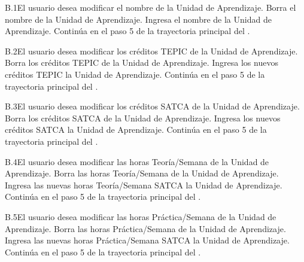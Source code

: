 
\begin{UCtrayectoriaA}{B.1}{El usuario desea modificar el nombre de la Unidad de Aprendizaje.}
	\UCpaso[\UCactor] Borra el nombre de la Unidad de Aprendizaje.
	\UCpaso[\UCactor] Ingresa el nombre de la Unidad de Aprendizaje.
	\UCpaso Continúa en el paso 5 de la trayectoria principal del .
\end{UCtrayectoriaA}


\begin{UCtrayectoriaA}{B.2}{El usuario desea modificar los créditos TEPIC de la Unidad de Aprendizaje.}
	\UCpaso[\UCactor] Borra los créditos TEPIC de la Unidad de Aprendizaje.
	\UCpaso[\UCactor] Ingresa los nuevos créditos TEPIC la Unidad de Aprendizaje.
	\UCpaso Continúa en el paso 5 de la trayectoria principal del .
\end{UCtrayectoriaA}



\begin{UCtrayectoriaA}{B.3}{El usuario desea modificar los créditos SATCA de la Unidad de Aprendizaje.}
	\UCpaso[\UCactor] Borra los créditos SATCA de la Unidad de Aprendizaje.
	\UCpaso[\UCactor] Ingresa los nuevos créditos SATCA la Unidad de Aprendizaje.
	\UCpaso Continúa en el paso 5 de la trayectoria principal del .
\end{UCtrayectoriaA}



\begin{UCtrayectoriaA}{B.4}{El usuario desea modificar las horas Teoría/Semana de la Unidad de Aprendizaje.}
	\UCpaso[\UCactor] Borra las horas Teoría/Semana de la Unidad de Aprendizaje.
	\UCpaso[\UCactor] Ingresa las nuevas horas Teoría/Semana SATCA la Unidad de Aprendizaje.
	\UCpaso Continúa en el paso 5 de la trayectoria principal del .
\end{UCtrayectoriaA}




\begin{UCtrayectoriaA}{B.5}{El usuario desea modificar las horas Práctica/Semana de la Unidad de Aprendizaje.}
	\UCpaso[\UCactor] Borra las horas Práctica/Semana de la Unidad de Aprendizaje.
	\UCpaso[\UCactor] Ingresa las nuevas horas Práctica/Semana SATCA la Unidad de Aprendizaje.
	\UCpaso Continúa en el paso 5 de la trayectoria principal del .
\end{UCtrayectoriaA}



